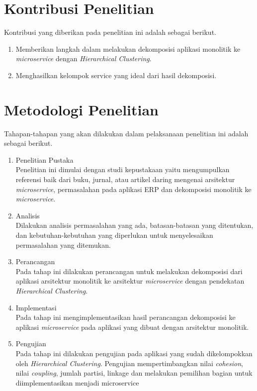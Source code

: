 \section{Kontribusi Penelitian}
Kontribusi yang diberikan pada penelitian ini adalah sebagai berikut.
\begin{enumerate}[nolistsep,leftmargin=0.5cm]
  \item Memberikan langkah dalam melakukan dekomposisi aplikasi monolitik ke \textit{microservice} dengan \textit{Hierarchical Clustering}.
  \item Menghasilkan kelompok service yang ideal dari hasil dekomposisi.\\
\end{enumerate}

\section{Metodologi Penelitian}
Tahapan-tahapan yang akan dilakukan dalam pelaksanaan penelitian ini adalah sebagai berikut.
\begin{enumerate}[nolistsep,leftmargin=0.5cm]
  \item Penelitian Pustaka \\
  Penelitian ini dimulai dengan studi kepustakaan yaitu mengumpulkan referensi baik dari buku, jurnal, atau artikel daring mengenai arsitektur \textit{microservice}, permasalahan pada aplikasi ERP dan dekomposisi monolitik ke \textit{microservice}.
  \item Analisis \\
  Dilakukan analisis permasalahan yang ada, batasan-batasan yang ditentukan, dan  kebutuhan-kebutuhan yang diperlukan untuk menyelesaikan permasalahan yang ditemukan.
  \item Perancangan \\
  Pada tahap ini dilakukan perancangan untuk melakukan dekomposisi dari aplikasi arsitektur monolitik ke arsitektur \textit{microservice} dengan pendekatan \textit{Hierarchical Clustering}.
  \item Implementasi \\
  Pada tahap ini mengimplementasikan hasil perancangan dekomposisi ke aplikasi \textit{microservice} pada aplikasi yang dibuat dengan arsitektur monolitik.
  \item Pengujian \\
  Pada tahap ini  dilakukan pengujian pada aplikasi yang sudah dikelompokkan oleh \textit{Hierarchical Clustering}. Pengujian mempertimbangkan nilai \textit{cohesion}, nilai \textit{coupling}, jumlah partisi, linkage dan melakukan pemilihan bagian untuk diimplementasikan menjadi microservice  \\ 
\end{enumerate}

